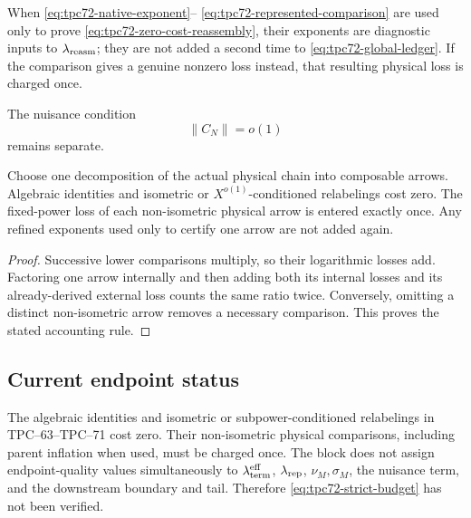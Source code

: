 When \eqref{eq:tpc72-native-exponent}--%
\eqref{eq:tpc72-represented-comparison} are used only to prove
\eqref{eq:tpc72-zero-cost-reassembly}, their exponents are diagnostic inputs
to \(\lambda_{\rm reasm}\); they are not added a second time to
\eqref{eq:tpc72-global-ledger}.  If the comparison gives a genuine nonzero
loss instead, that resulting physical loss is charged once.

The nuisance condition
\begin{equation}
 \|C_N\|=o(1)
 \label{eq:tpc72-nuisance-small}
\end{equation}
remains separate.

\begin{proposition}
\label{prop:no-double-charge}
Choose one decomposition of the actual physical chain into composable
arrows.  Algebraic identities and isometric or \(X^{o(1)}\)-conditioned
relabelings cost zero.  The fixed-power loss of each non-isometric physical
arrow is entered exactly once.  Any refined exponents used only to certify
one arrow are not added again.
\end{proposition}

\begin{proof}
Successive lower comparisons multiply, so their logarithmic losses add.
Factoring one arrow internally and then adding both its internal losses and
its already-derived external loss counts the same ratio twice.  Conversely,
omitting a distinct non-isometric arrow removes a necessary comparison.
This proves the stated accounting rule.
\end{proof}

\subsection{Current endpoint status}

The algebraic identities and isometric or subpower-conditioned relabelings
in TPC--63--TPC--71 cost zero.  Their non-isometric physical comparisons,
including parent inflation when used, must be charged once.  The block does
not assign endpoint-quality values simultaneously to
\(\lambda_{\rm term}^{\rm eff}\), \(\lambda_{\rm rep}\),
\(\nu_M,\sigma_M\), the nuisance term, and the downstream boundary and tail.
Therefore \eqref{eq:tpc72-strict-budget} has not been verified.
